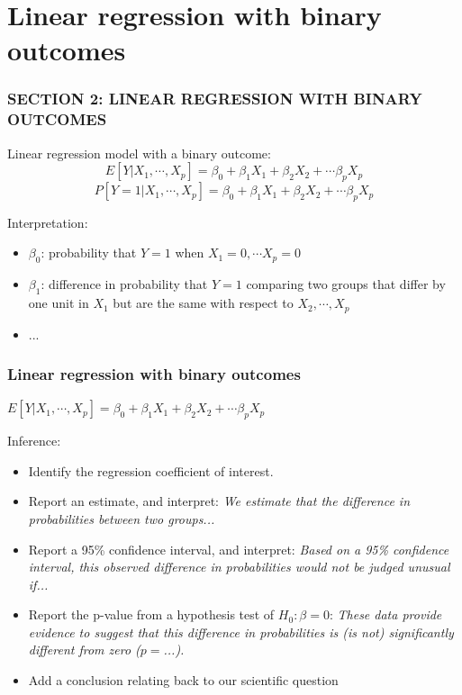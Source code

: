 \documentclass[12pt, 
hyperref={colorlinks=true, linkcolor=blue, urlcolor=cyan}]{beamer}
\begin{document}
\section{Linear regression with binary outcomes}
\begin{frame}
\frametitle{SECTION 2: LINEAR REGRESSION WITH BINARY OUTCOMES}

Linear regression model with a binary outcome: $$E[Y|X_1,\cdots,X_p] = \beta_0 + \beta_1 X_1 + \beta_2X_2 + \cdots \beta_p X_p$$ $$P[Y=1|X_1,\cdots,X_p] = \beta_0 + \beta_1 X_1 + \beta_2 X_2 + \cdots \beta_p X_p$$

Interpretation:
\begin{itemize}
\item $\beta_0$: probability that $Y=1$ when $X_1 = 0, \cdots X_p = 0$
\item $\beta_1$: difference in probability that $Y=1$ comparing two groups that differ by one unit in $X_1$ but are the same with respect to $X_2,\cdots,X_p$ 
\item ...
\end{itemize}
\end{frame}

\begin{frame}
\frametitle{Linear regression with binary outcomes}
\begin{center} $E[Y|X_1,\cdots,X_p] = \beta_0 + \beta_1 X_1 + \beta_2 X_2 + \cdots \beta_p X_p$ \end{center}

\vspace{-0.6cm}
\color{blue} Inference: \vspace{-0.3cm} \color{black}
\begin{itemize}
\item Identify the regression coefficient of interest. \pause %
\item Report an estimate, and interpret: \textit{We estimate that the difference in probabilities between two groups...} \pause
\item Report a 95\% confidence interval, and interpret: \textit{Based on a 95\% confidence interval, this observed difference in probabilities would not be judged unusual if...} \pause
\item Report the p-value from a hypothesis test of $H_0: \beta = 0$: \textit{These data provide evidence to suggest that this difference in probabilities is (is not) significantly different from zero ($p =$...).} \pause
\item Add a conclusion relating back to our scientific question
\end{itemize}
\end{frame}
\end{document}
